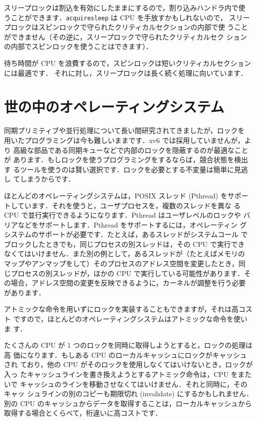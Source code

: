 スリープロックは割込を有効にしたままにするので，割り込みハンドラ内で使
うことができます．\lstinline{acquiresleep} は CPU を手放すかもしれないので，
スリープロックはスピンロックで守られたクリティカルセクションの内部で使
うことができません（その逆に，スリープロックで守られたクリティカルセク
ションの内部でスピンロックを使うことはできます）．

待ち時間が CPU を浪費するので，スピンロックは短いクリティカルセクションには最適です．
それに対し，スリープロックは長く続く処理に向いています．

\section{世の中のオペレーティングシステム}
同期プリミティブや並行処理について長い間研究されてきましたが，ロックを
用いたプログラミングは今も難しいままです．xv6 では採用していませんが，より
高級な部品である同期キューなどで内部のロックを隠蔽するのが最適なことが
あります．もしロックを使うプログラミングをするならば，競合状態を検出す
るツールを使うのは賢い選択です．ロックを必要とする不変量は簡単に見逃し
てしまうからです．

ほとんどのオペレーティングシステムは，POSIX スレッド (Pthread) をサポー
トしています．それを使うと，ユーザプロセスを，複数のスレッドを異な
る CPU で並行実行できるようになります．Pthread はユーザレベルのロックや
バリアなどをサポートします．Pthread をサポートするには，オペレーティン
グシステムのサポートが必要です．たとえば，あるスレッドがシステムコール
でブロックしたときでも，同じプロセスの別スレッドは，その CPU で実行でき
なくてはいけません．また別の例として，あるスレッドが（たとえばメモリの
マップやアンマップをして）そのプロセスのアドレス空間を変更したとき，同
じプロセスの別スレッドが，ほかの CPU で実行している可能性があります．そ
の場合，アドレス空間の変更を反映できるように，カーネルが調整を行う必要
があります．

アトミックな命令を用いずにロックを実装することもできますが，それは高コスト
ですので，ほとんどのオペレーティングシステムはアトミックな命令を使いま
す．

たくさんの CPU が 1 つのロックを同時に取得しようとすると，ロックの処理は高
価になります．もしある CPU のローカルキャッシュにロックがキャッシュされ
ており，他の CPU がそのロックを使用しなくてはいけないとき，ロックが入っ
たキャッシュラインを書き換えようとするアトミック命令は，CPU をまたいで
キャッシュのラインを移動させなくてはいけません．それと同時に，そのキャッ
シュラインの別のコピーも期限切れ (invalidate) にするかもしれません．
別の CPU のキャッシュからデータを取得することは，ローカルキャッシュから
取得する場合とくらべて，桁違いに高コストです．

